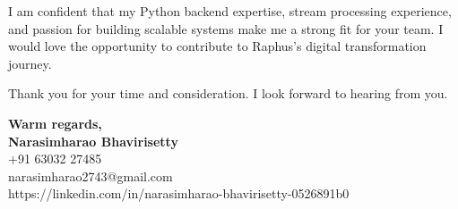 \documentclass[10pt]{article}
\begin{document}
I am confident that my Python backend expertise, stream processing experience, and passion for building scalable systems make me a strong fit for your team. I would love the opportunity to contribute to Raphus's digital transformation journey.

Thank you for your time and consideration. I look forward to hearing from you.

\vspace{16pt}

\textbf{Warm regards,}\\[6pt]
\textbf{Narasimharao Bhavirisetty}\\
+91 63032 27485\\
narasimharao2743@gmail.com\\
https://linkedin.com/in/narasimharao-bhavirisetty-0526891b0
\end{document}
